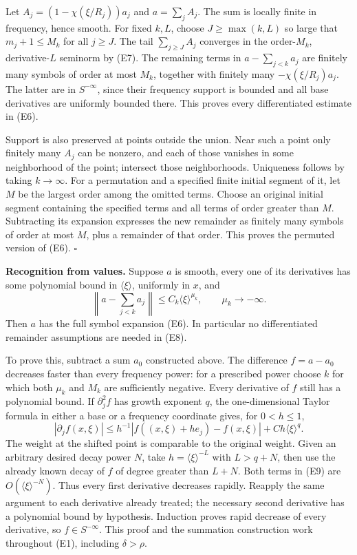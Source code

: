 \documentclass[
  11pt,
]{article}
\begin{document}
Let \(A_j=(1-\chi(\xi/R_j))a_j\) and \(a=\sum_jA_j\). The sum is locally
finite in frequency, hence smooth. For fixed \(k,L\), choose
\(J\geq\max(k,L)\) so large that \(m_j+1\leq M_k\) for all \(j\geq J\).
The tail \(\sum_{j\geq J}A_j\) converges in the order-\(M_k\),
derivative-\(L\) seminorm by (E7). The remaining terms in
\(a-\sum_{j<k}a_j\) are finitely many symbols of order at most \(M_k\),
together with finitely many \(-\chi(\xi/R_j)a_j\). The latter are in
\(S^{-\infty}\), since their frequency support is bounded and all base
derivatives are uniformly bounded there. This proves every
differentiated estimate in (E6).

Support is also preserved at points outside the union. Near such a point
only finitely many \(A_j\) can be nonzero, and each of those vanishes in
some neighborhood of the point; intersect those neighborhoods.
Uniqueness follows by taking \(k\to\infty\). For a permutation and a
specified finite initial segment of it, let \(M\) be the largest order
among the omitted terms. Choose an original initial segment containing
the specified terms and all terms of order greater than \(M\).
Subtracting its expansion expresses the new remainder as finitely many
symbols of order at most \(M\), plus a remainder of that order. This
proves the permuted version of (E6). \(\square\)

\textbf{Recognition from values.} Suppose \(a\) is smooth, every one of
its derivatives has some polynomial bound in \(\langle\xi\rangle\),
uniformly in \(x\), and \[
\left\|a-\sum_{j<k}a_j\right\|\leq C_k\langle\xi\rangle^{\mu_k},
\qquad \mu_k\to-\infty.
\tag{E8}
\] Then \(a\) has the full symbol expansion (E6). In particular no
differentiated remainder assumptions are needed in (E8).

To prove this, subtract a sum \(a_0\) constructed above. The difference
\(f=a-a_0\) decreases faster than every frequency power: for a
prescribed power choose \(k\) for which both \(\mu_k\) and \(M_k\) are
sufficiently negative. Every derivative of \(f\) still has a polynomial
bound. If \(\partial_j^2 f\) has growth exponent \(q\), the
one-dimensional Taylor formula in either a base or a frequency
coordinate gives, for \(0<h\leq1\), \[
|\partial_j f(x,\xi)|
\leq h^{-1}|f((x,\xi)+he_j)-f(x,\xi)|
+C h\langle\xi\rangle^q.
\tag{E9}
\] The weight at the shifted point is comparable to the original weight.
Given an arbitrary desired decay power \(N\), take
\(h=\langle\xi\rangle^{-L}\) with \(L>q+N\), then use the already known
decay of \(f\) of degree greater than \(L+N\). Both terms in (E9) are
\(O(\langle\xi\rangle^{-N})\). Thus every first derivative decreases
rapidly. Reapply the same argument to each derivative already treated;
the necessary second derivative has a polynomial bound by hypothesis.
Induction proves rapid decrease of every derivative, so
\(f\in S^{-\infty}\). This proof and the summation construction work
throughout (E1), including \(\delta>\rho\).
\end{document}
